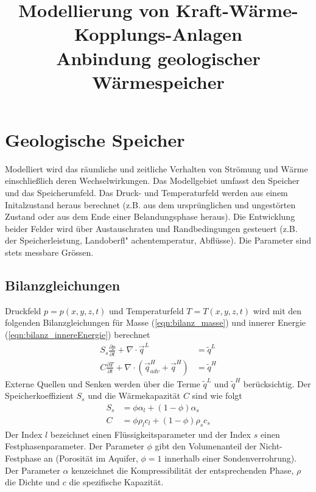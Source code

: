 \documentclass[12pt, a4paper, twoside, titlepage]{article}
\title{Modellierung von Kraft-W\" arme-Kopplungs-Anlagen \\
Anbindung geologischer W\" armespeicher}
\begin{document}
\maketitle
 

\section{Geologische Speicher}
%
Modelliert wird das r\" aumliche und zeitliche Verhalten von Str\" omung und W\" arme einschlie\ss lich deren Wechselwirkungen.
%
Das Modellgebiet umfasst den Speicher und das Speicherumfeld.
%
Das Druck- und Temperaturfeld werden aus einem Initalzustand heraus berechnet (z.B. aus dem urspr\" unglichen und ungest\" orten Zustand oder aus dem Ende einer Belandungsphase heraus).
%
Die Entwicklung beider Felder wird \" uber Austauschraten und Randbedingungen gesteuert
(z.B. der Speicherleistung, Landoberfl" achentemperatur, Abfl\" usse).
%
Die Parameter sind stets messbare Gr\" ossen.
%
%
\subsection{Bilanzgleichungen} 
%
%
\noindent
Druckfeld $p = p(x, y, z, t)$ und Temperaturfeld $T = T(x,y,z, t)$ wird mit den folgenden Bilanzgleichungen f\" ur Masse (\ref{eqn:bilanz_masse}) und innerer Energie (\ref{eqn:bilanz_innereEnergie}) berechnet
%
\begin{subequations}
\begin{align}
S_s\frac{\partial p}{\partial t} + \nabla \cdot \vec q^L &= \tilde q^L
\label{eqn:bilanz_masse} \\
C\frac{\partial T}{\partial t} + \nabla \cdot \left(\vec q_{adv}^H +  \vec q^H \right ) &= \tilde q^H
\label{eqn:bilanz_innereEnergie}
\end{align}
\end{subequations}
%
Externe Quellen und Senken werden \" uber die Terme $\tilde q^L$ und $\tilde q^H$ ber\" ucksichtig.
\noindent
Der Speicherkoeffizient $S_s$ und die W\" armekapazit\" at $C$ sind wie folgt
%
\begin{subequations}
\begin{align}
S_s &= \phi \alpha_l + (1-\phi) \alpha_s \\
C &= \phi \rho_l c_l + (1-\phi) \rho_s c_s
\end{align}
\end{subequations}
%
Der Index $l$ bezeichnet einen Fl\" ussigkeitsparameter und der Index $s$ einen Festphasenparameter.
%
Der Parameter $\phi$ gibt den Volumenanteil der Nicht-Festphase an
(Porosit\" at im Aquifer, $\phi=1$ innerhalb einer Sondenverrohrung).
%
Der Parameter $\alpha$ kenzeichnet die Kompressibilit\" at der entsprechenden Phase,
%
$\rho$ die Dichte und $c$ die spezifische Kapazit\" at.
%
\end{document}
